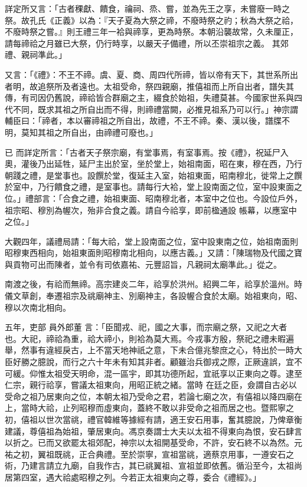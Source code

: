 \begin{pinyinscope}
 詳定所又言：「古者稞獻、饋食，禴祠、烝、嘗，並為先王之享，未嘗廢一時之祭。故孔氏《正義》以為：『天子夏為大祭之禘，不廢時祭之礿；秋為大祭之祫，不廢時祭之嘗。』則王禮三年一袷與禘享，更為時祭。本朝沿襲故常，久未厘正，請每禘祫之月雖已大祭，仍行時享，以嚴天子備禮，所以丕崇祖宗之義。
 其郊禮、親祠準此。」



 又言：「《禮》：不王不禘。虞、夏、商、周四代所禘，皆以帝有天下，其世系所出者明，故追祭所及者遠也。太祖受命，祭四親廟，推僖祖而上所自出者，譜失其傳，有司因仍舊說，禘祫皆合群廟之主，綴食於始祖，失禮莫甚。今國家世系與四代不同，既求其祖之所自出而不得，則禘禮當闕，必推見祖系乃可以行。」神宗謂輔臣曰：「禘者，本以審禘祖之所自出，故禮，不王不禘。秦、漢以後，譜牒不明，莫知其祖之所自出，由禘禮可廢也。」



 已
 而詳定所言：「古者天子祭宗廟，有堂事焉，有室事焉。按《禮》，祝延尸入奧，灌後乃出延牲，延尸主出於室，坐於堂上，始祖南面，昭在東，穆在西，乃行朝踐之禮，是堂事也。設饌於堂，復延主入室，始祖東面，昭南穆北，徙常上之饌於室中，乃行饋食之禮，是室事也。請每行大袷，堂上設南面之位，室中設東面之位。」禮部言：「合食之禮，始祖東面、昭南穆北者，本室中之位也。今設位戶外，祖宗昭、穆別為幄次，殆非合食之義。請自今祫享，即前楹通設
 帳幕，以應室中之位。」



 大觀四年，議禮局請：「每大祫，堂上設南面之位，室中設東南之位，始祖南面則昭穆東西相向，始祖東面則昭穆南北相向，以應古義。」又請：「陳瑞物及代國之寶與貢物可出而陳者，並令有司依嘉祐、元豐詔旨，凡親祠太廟準此。」從之。



 南渡之後，有祫而無禘。高宗建炎二年，祫享於洪州。紹興二年，祫享於溫州。時儀文草創，奉遷祖宗及祧廟神主、別廟神主，各設幄合食於太廟。始祖東向，昭、穆以次南北相向。


五年，吏部
 員外郎董
 言：「臣聞戎、祀，國之大事，而宗廟之祭，又祀之大者也。大祀，禘祫為重，祫大禘小，則袷為莫大焉。今戎事方殷，祭祀之禮未暇遍舉，然事有違經戾古，上不當天地神祇之意，下未合億兆黎庶之心，特出於一時大臣好勝之臆說，而行之六十年未有知其非者。顧雖治兵御戎之際，正厥違誤，宜不可緩。仰惟太祖受天明命，混一區宇，即其功德所起，宜祇享以正東向之尊。逮至仁宗，親行祫享，嘗議太祖東向，用昭正統之緒。當時
 在廷之臣，僉謂自古必以受命之祖乃居東向之位，本朝太祖乃受命之君，若論七廟之次，有僖祖以降四廟在上，當時大祫，止列昭穆而虛東向，蓋終不敢以非受命之祖而居之也。暨熙寧之初，僖祖以世次當祧，禮官韓維等據經有請，適王安石用事，奮其臆說，乃俾章衡建議，尊僖祖為始祖，肇居東向。馮京奏謂士大夫以太祖不得東向為恨，安石肆言以折之。已而又欲罷太祖郊配，神宗以太祖開基受命，不許，安石終不以為然。元
 祐之初，翼祖既祧，正合典禮。至於崇寧，宣祖當祧，適蔡京用事，一遵安石之術，乃建言請立九廟，自我作古，其已祧翼祖、宣祖並即依舊。循沿至今，太祖尚居第四室，遇大祫處昭穆之列。今若正太祖東向之尊，委合《禮經》。」



\end{pinyinscope}

